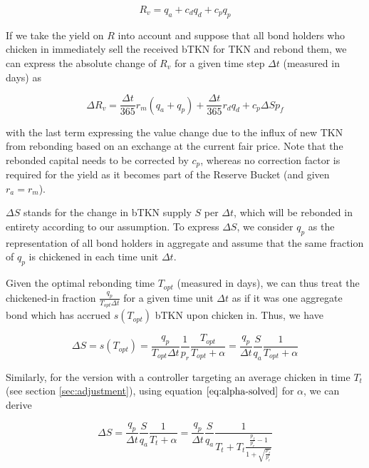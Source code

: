\documentclass{article}
\begin{document}
\begin{equation}
  \label{eq:correction-factors}
  R_v = q_a + c_d q_d + c_p q_p
\end{equation}

If we take the yield on $R$ into account and suppose that all bond holders who chicken in immediately sell the received bTKN for TKN and rebond them, we can express the absolute change of $R_v$ for a given time step $\Delta t$ (measured in days) as

\begin{equation}
  \label{eq:treasury-growth}
  \Delta R_v = \frac{\Delta t}{365} r_m (q_a + q_p) + \frac{\Delta t}{365} r_d  q_d + c_p \Delta S p_f 
\end{equation}

with the last term expressing the value change due to the influx of new TKN from rebonding based on an exchange at the current fair price. Note that the rebonded capital needs to be corrected by $c_p$, whereas no correction factor is required for the yield as it becomes part of the Reserve Bucket (and given $r_a=r_m$).

$\Delta S$ stands for the change in bTKN supply $S$ per $\Delta t$, which will be rebonded in entirety according to our assumption. To express $\Delta S$, we consider $q_p$ as the representation of all bond holders in aggregate and assume that the same fraction of $q_p$ is chickened in each time unit $\Delta t$. 

Given the optimal rebonding time $T_{opt}$ (measured in days), we can thus treat the chickened-in fraction  $\frac{q_p}{T_{opt} \Delta t}$ for a given time unit $\Delta t$ as if it was one aggregate bond which has accrued $s(T_{opt})$ bTKN upon chicken in. Thus, we have

\begin{equation}
  \label{}
  \Delta S = s(T_{opt}) = \frac{q_p}{T_{opt} \Delta t} \frac{1}{p_r} \frac{T_{opt}}{T_{opt}+\alpha} = \frac{q_p}{\Delta t} \frac{S}{q_a} \frac{1}{T_{opt}+\alpha}
\end{equation}

Similarly, for the version with a controller targeting an average chicken in time $T_t$ (see section \ref{sec:adjustment}), using equation $\ref{eq:alpha-solved}$ for $\alpha$, we can derive

\begin{equation}
  \label{}
  \Delta S = \frac{q_p}{\Delta t} \frac{S}{q_a} \frac{1}{T_t+\alpha}
  = \frac{q_p}{\Delta t} \frac{S}{q_a} \frac{1}{T_t+ T_t\frac{\frac{p_f}{p_r} - 1}{1 + \sqrt{\frac{p_f}{p_r}}}}  
\end{equation}
\end{document}
